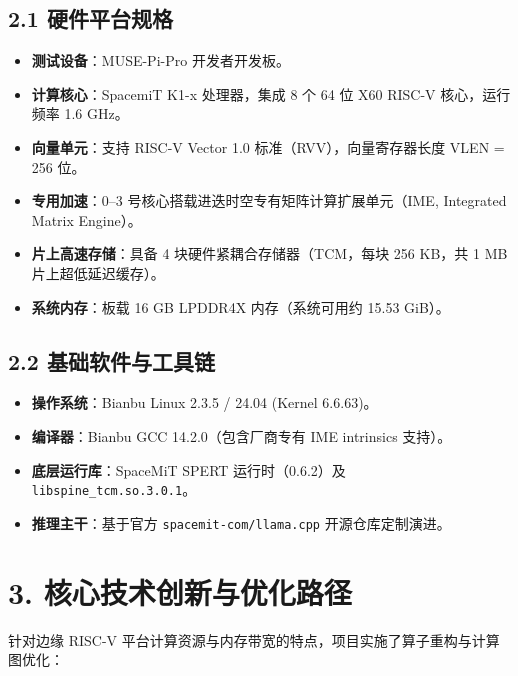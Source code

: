 \documentclass[10pt,a4paper,fontset=none]{ctexart}
\begin{document}
\subsection{2.1 硬件平台规格}
\begin{itemize}
  \item \textbf{测试设备}：MUSE-Pi-Pro 开发者开发板。
  \item \textbf{计算核心}：SpacemiT K1-x 处理器，集成 8 个 64 位 X60 RISC-V 核心，运行频率 1.6 GHz。
  \item \textbf{向量单元}：支持 RISC-V Vector 1.0 标准（RVV），向量寄存器长度 VLEN = 256 位。
  \item \textbf{专用加速}：0--3 号核心搭载进迭时空专有矩阵计算扩展单元（IME, Integrated Matrix Engine）。
  \item \textbf{片上高速存储}：具备 4 块硬件紧耦合存储器（TCM，每块 256 KB，共 1 MB 片上超低延迟缓存）。
  \item \textbf{系统内存}：板载 16 GB LPDDR4X 内存（系统可用约 15.53 GiB）。
\end{itemize}

\subsection{2.2 基础软件与工具链}
\begin{itemize}
  \item \textbf{操作系统}：Bianbu Linux 2.3.5 / 24.04 (Kernel 6.6.63)。
  \item \textbf{编译器}：Bianbu GCC 14.2.0（包含厂商专有 IME intrinsics 支持）。
  \item \textbf{底层运行库}：SpaceMiT SPERT 运行时（0.6.2）及 \texttt{libspine\_tcm.so.3.0.1}。
  \item \textbf{推理主干}：基于官方 \texttt{spacemit-com/llama.cpp} 开源仓库定制演进。
\end{itemize}

\section{3. 核心技术创新与优化路径}

针对边缘 RISC-V 平台计算资源与内存带宽的特点，项目实施了算子重构与计算图优化：
\end{document}
